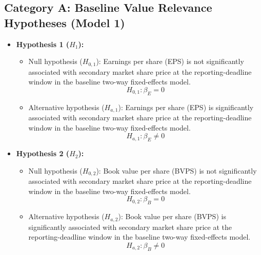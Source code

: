 \subsection{Category A: Baseline Value Relevance Hypotheses (Model 1)}
\begin{itemize}
\item \textbf{Hypothesis 1 ($H_1$):}
\begin{itemize}
\item Null hypothesis ($H_{0,1}$): Earnings per share (EPS) is not significantly associated with secondary market share price at the reporting-deadline window in the baseline two-way fixed-effects model.
\begin{equation}
H_{0,1}: \beta_E = 0
\end{equation}
\item Alternative hypothesis ($H_{a,1}$): Earnings per share (EPS) is significantly associated with secondary market share price at the reporting-deadline window in the baseline two-way fixed-effects model.
\begin{equation}
H_{a,1}: \beta_E \ne 0
\end{equation}
\end{itemize}

\item \textbf{Hypothesis 2 ($H_2$):}
\begin{itemize}
\item Null hypothesis ($H_{0,2}$): Book value per share (BVPS) is not significantly associated with secondary market share price at the reporting-deadline window in the baseline two-way fixed-effects model.
\begin{equation}
H_{0,2}: \beta_B = 0
\end{equation}
\item Alternative hypothesis ($H_{a,2}$): Book value per share (BVPS) is significantly associated with secondary market share price at the reporting-deadline window in the baseline two-way fixed-effects model.
\begin{equation}
H_{a,2}: \beta_B \ne 0
\end{equation}
\end{itemize}
\end{itemize}

